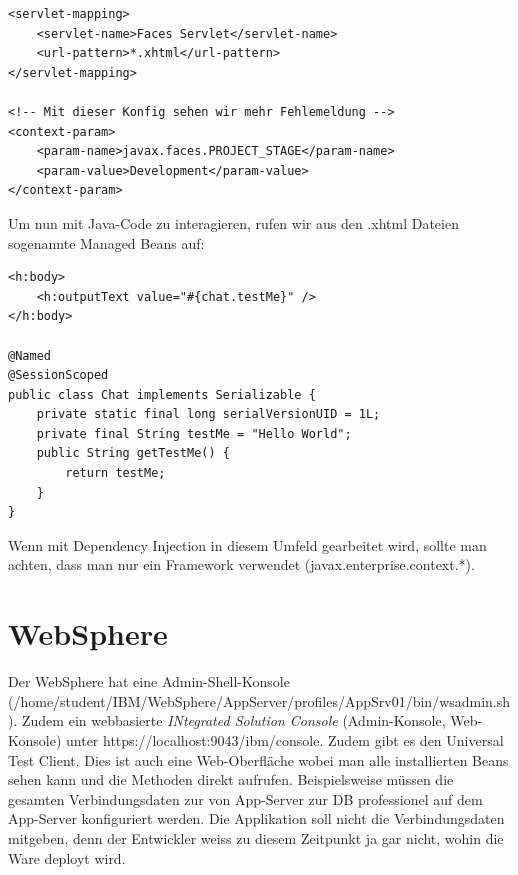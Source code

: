 \begin{lstlisting}
<servlet-mapping>
	<servlet-name>Faces Servlet</servlet-name>
	<url-pattern>*.xhtml</url-pattern>
</servlet-mapping>

<!-- Mit dieser Konfig sehen wir mehr Fehlemeldung -->
<context-param>
	<param-name>javax.faces.PROJECT_STAGE</param-name>
	<param-value>Development</param-value>
</context-param>
\end{lstlisting}

Um nun mit Java-Code zu interagieren, rufen wir aus den .xhtml Dateien sogenannte Managed Beans auf:

\begin{lstlisting}
<h:body>
	<h:outputText value="#{chat.testMe}" />
</h:body>

@Named
@SessionScoped
public class Chat implements Serializable {
	private static final long serialVersionUID = 1L;
	private final String testMe = "Hello World";
	public String getTestMe() {
		return testMe;
	}
}
\end{lstlisting}

Wenn mit Dependency Injection in diesem Umfeld gearbeitet wird, sollte man achten, dass man nur ein Framework verwendet (javax.enterprise.context.*).

\section{WebSphere}
Der WebSphere hat eine Admin-Shell-Konsole (/home/student/IBM/WebSphere/AppServer/profiles/AppSrv01/bin/wsadmin.sh). Zudem ein webbasierte \emph{INtegrated Solution Console}  (Admin-Konsole, Web-Konsole) unter https://localhost:9043/ibm/console. Zudem gibt es den Universal Test Client. Dies ist auch eine Web-Oberfläche wobei man alle installierten Beans sehen kann und die Methoden direkt aufrufen. Beispielsweise müssen die gesamten Verbindungsdaten zur von App-Server zur DB professionel auf dem App-Server konfiguriert werden. Die Applikation soll nicht die Verbindungsdaten mitgeben, denn der Entwickler weiss zu diesem Zeitpunkt ja gar nicht, wohin die Ware deployt wird.

